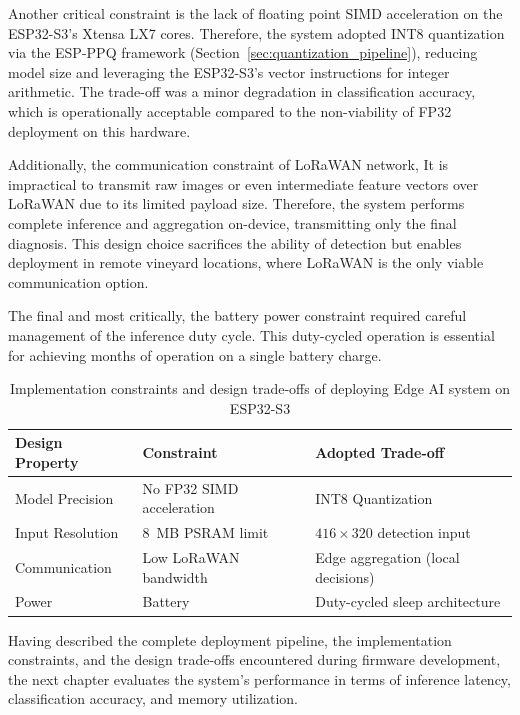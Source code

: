 Another critical constraint is the lack of floating point SIMD acceleration on the ESP32-S3's Xtensa LX7 cores. Therefore, the system  adopted INT8 quantization via the ESP-PPQ framework (Section~\ref{sec:quantization_pipeline}), reducing model size and leveraging the ESP32-S3's vector instructions for integer arithmetic. The trade-off was a minor degradation in classification accuracy, which is operationally acceptable compared to the non-viability of FP32 deployment on this hardware.



Additionally, the communication constraint of LoRaWAN network, It is impractical to transmit raw images or even intermediate feature vectors over LoRaWAN due to its limited payload size. Therefore, the system performs complete inference and aggregation on-device, transmitting only the final diagnosis. This design choice sacrifices the ability of detection but enables deployment in remote vineyard locations, where LoRaWAN is the only viable communication option.


The final and most critically, the battery power constraint required careful management of the inference duty cycle. This duty-cycled operation is essential for achieving months of operation on a single battery charge. 
\vspace{3mm}
\begin{table}[htbp]
\centering
\small
\begin{tabular}{@{}lll@{}}
\toprule
\textbf{Design Property} & \textbf{Constraint} & \textbf{Adopted Trade-off} \\
\midrule
Model Precision & No FP32 SIMD acceleration & INT8 Quantization \\
Input Resolution & 8~MB PSRAM limit & $416 \times 320$ detection input \\
Communication & Low LoRaWAN bandwidth & Edge aggregation (local decisions) \\
Power & Battery & Duty-cycled sleep architecture \\
\bottomrule
\end{tabular}
\caption{Implementation constraints and design trade-offs of deploying Edge AI system on ESP32-S3}
\label{tab:design_tradeoffs}
\end{table}

Having described the complete deployment pipeline, the implementation constraints, and the design trade-offs encountered during firmware development, the next chapter evaluates the system's performance in terms of inference latency, classification accuracy, and memory utilization.